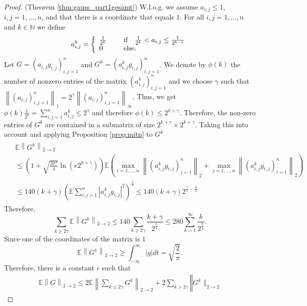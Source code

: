 \documentclass[12pt,a4paper]{article}
\newcommand{\N}{\ensuremath{{\mathbb N}}}
\newcommand{\Ex}{\mathbb{E}}
\newcommand{\norm}[1]{\left \lVert#1 \right\rVert}
\begin{document}
\begin{proof} (Theorem \ref{thm:gauss_part1gesamt}) W.l.o.g. we assume $a_{i,j}\leq 1$, $i,j=1,...,n$, and that there is a coordinate
that equals $1$. For all $i,j=1,...,n$ and $k\in\N$ we define
	\begin{equation*}
	  a_{i,j}^k = 
	   \left\{ 
	    \begin{array}{ll}
	                 \frac{1}{2^k} &  \hskip 5mm
	                 \hbox{if}\quad \frac{1}{2^k}<a_{i,j}\leq \frac{1}{2^{k-1}} \\
	                 0 & \hskip 5mm\hbox{else}.
	    \end{array} 
	   \right.
	 \end{equation*}
Let $G=(a_{i,j}g_{i,j})_{i,j=1}^n$ and $G^k=(a_{i,j}^{k}g_{i,j})_{i,j=1}^n$.
We denote by $\phi(k)$ the number of nonzero entries of the matrix
 $(a_{i,j}^k)_{i,j=1}^n$ and we choose $\gamma$ such that $\norm{(a_{i,j})_{i,j=1}^n}_1=2^{\gamma}\norm{(a_{i,j})_{i,j=1}^n}_{\infty}$. Thus, we get $\phi(k)\frac{1}{2^k}=\sum\limits_{i,j=1}^na_{i,j}^k\leq 2^{\gamma}$ and therefore $\phi(k)\leq 2^{k+\gamma}$.
Therefore, the non-zero entries of $G^{k}$ are contained in a submatrix of size
$2^{k+\gamma}\times 2^{k+\gamma}$.
Taking this into account and applying Proposition \ref{prop:mitn} to $G^{k}$ 
\begin{eqnarray*}
\left.\begin{split}
&\Ex\norm{G^k}_{2\rightarrow 2}  \\
&\leq\left(1+\sqrt{\frac{3\pi^{3}}{4}}\ln(e2^{k+\gamma})\right)
\mathbb E\left(\max\limits_{i=1,...,n}\norm{(a^k_{i,j}g_{i,j})_{j=1}^n}_2			+\max\limits_{j=1,...,n}\norm{(a^k_{i,j}g_{i,j})_{i=1}^n}_2\right)  \\
&\leq 140(k+\gamma)
\left(\mathbb E\sum_{i,j=1}^{n}|a_{i,j}^{k}g_{i,j}|^{2}\right)^{\frac{1}{2}}
\leq 140(k+\gamma)2^{\frac{\gamma}{2}-\frac{k}{2}}
\end{split}\right.
\end{eqnarray*}
Therefore,
$$
\sum\limits_{k\geq2\gamma}\limits^{} \Ex\norm{G^k}_{2\rightarrow 2}
\leq140\sum_{k\geq2\gamma}
\frac{k+\gamma}{2^{\frac{k}{4}}}
\leq280\sum_{k=1}^{\infty}
\frac{k}{2^{\frac{k}{4}}}.
$$
Since one of the coordinates of the matrix is $1$
$$
 \Ex\norm{G^1}_{2\rightarrow 2}
 \geq \int_{-\infty}^{\infty}|g|dt
 =\sqrt{\frac{2}{\pi}}.
$$
Therefore, there is a constant $c$ such that
\begin{eqnarray*}
\Ex\norm{G}_{2\rightarrow 2}
\leq2\mathbb E\left\|\sum_{k\leq 2\gamma}G^{k}\right\|_{2\rightarrow 2}
+2\sum_{k>2\gamma}\mathbb \|G^{k}\|_{2\rightarrow 2}

\end{eqnarray*}
\end{proof}
\end{document}
